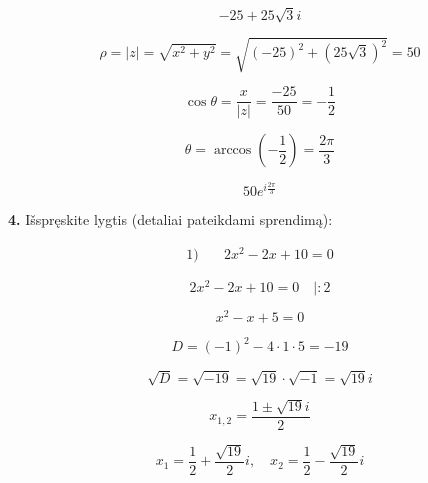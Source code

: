 \documentclass{article}
\begin{document}

\begin{equation}
-25+25\sqrt{3}i\tag{1}
\end{equation}

\begin{equation}
\rho=|z|=\sqrt{x^2+y^2}=\sqrt{(-25)^2+(25\sqrt{3})^2}=50\tag{2}
\end{equation}

\begin{equation}
\cos \theta = \frac{x}{|z|} = \frac{-25}{50} = -\frac{1}{2} \tag{3}
\end{equation}

\begin{equation}
\theta = \arccos(-\frac{1}{2}) = \frac{2\pi}{3} \tag{4}
\end{equation}


\begin{equation*}
50e^{i\frac{2\pi}{3}}
\end{equation*}

\pagebreak

\textbf{4.} Išspręskite lygtis (detaliai pateikdami sprendimą):

\begin{align}
\text{1)}\quad & 2x^2- 2x+10=0 \nonumber
\end{align}


\begin{equation}
2x^2- 2x+10=0\quad | :2 \tag{1}
\end{equation}

\begin{equation}
x^2- x+5=0\tag{2}
\end{equation}

\begin{equation}
D=(-1)^2-4 \cdot 1 \cdot 5=-19 \tag{3}
\end{equation}

\begin{equation}
\sqrt{D}=\sqrt{-19}=\sqrt{19} \cdot \sqrt{-1}=\sqrt{19}i\tag{4}
\end{equation}

\begin{equation}
x_{1,2}=\frac{1\pm\sqrt{19}i}{2}\tag{5}
\end{equation}


\begin{equation*}
x_{1}=\frac{1}{2}+\frac{\sqrt{19}}{2}i, \quad x_{2}=\frac{1}{2}-\frac{\sqrt{19}}{2}i
\end{equation*}
\end{document}

